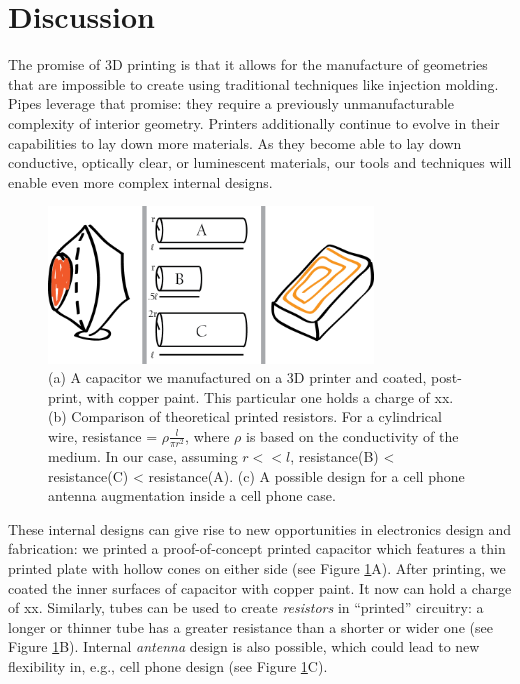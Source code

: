 \section{Discussion}



The promise of 3D printing is that it allows for the manufacture of geometries that are impossible to create using traditional techniques like injection molding.  Pipes leverage that promise: they require a previously unmanufacturable complexity of interior geometry.  Printers additionally continue to evolve in their capabilities to lay down more materials.  As they become able to lay down conductive, optically clear, or luminescent materials, our tools and techniques will enable even more complex internal designs.

\begin{figure}[h]
\centering
    \includegraphics[width=3.4in]{figures/electronics.png}
\caption{(a) A capacitor we manufactured on a 3D printer and coated, post-print, with copper paint.  This particular one holds a charge of xx.  (b) Comparison of theoretical printed resistors.  For a cylindrical wire, resistance = $\rho\frac{l}{\pi r^2}$, where $\rho$ is based on the conductivity of the medium.  In our case, assuming $ r << l$, resistance(B) < resistance(C) < resistance(A).  (c) A possible design for a cell phone antenna augmentation inside a cell phone case.}
\label{fig:electronics}
\end{figure}

These internal designs can give rise to new opportunities in electronics design and fabrication: we printed a proof-of-concept printed capacitor which features a thin printed plate with hollow cones on either side (see Figure \ref{fig:electronics}A).  After printing, we coated the inner surfaces of capacitor with copper paint.  It now can hold a charge of xx.  Similarly, tubes can be used to create \emph{resistors} in ``printed'' circuitry: a longer or thinner tube has a greater resistance than a shorter or wider one (see Figure \ref{fig:electronics}B).  Internal \emph{antenna} design is also possible, which could lead to new flexibility in, e.g., cell phone design (see Figure \ref{fig:electronics}C).

